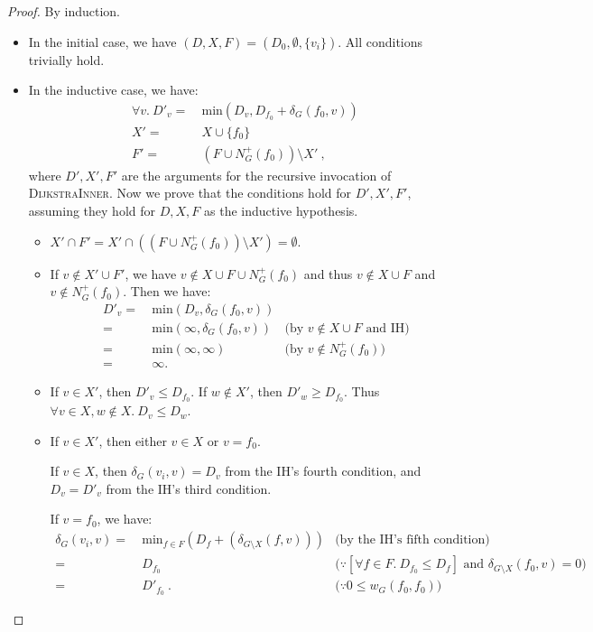 \documentclass[11pt,a4paper,oneside,microtype,nokorean]{oblivoir}
\begin{document}
\begin{proof}
  By induction.

  \begin{itemize}
  \item In the initial case, we have $(D, X, F) = (D_0, \emptyset, \{v_i\})$.  All conditions trivially hold.
  \item In the inductive case, we have:
    \begin{align*}
      \forall v.~D'_v =&~ \textrm{min}(D_v, D_{f_0} + \delta_G(f_0,v)) \\
      X' =&~ X \cup \{f_0\} \\
      F' =&~ (F \cup N^+_G(f_0)) \setminus X'~,
    \end{align*}
    where $D', X', F'$ are the arguments for the recursive invocation of \textsc{DijkstraInner}.
    Now we prove that the conditions hold for $D', X', F'$, assuming they hold for $D, X, F$ as the
    inductive hypothesis.

    \begin{itemize}
    \item $X' \cap F' = X' \cap ((F \cup N^+_G(f_0)) \setminus X') = \emptyset$.

    \item If $v \notin X' \cup F'$, we have $v \notin X \cup F \cup N^+_G(f_0)$ and thus
      $v \notin X \cup F$ and $v \notin N^+_G(f_0)$.  Then we have:
      \begin{align*}
        D'_v
        =&~ \textrm{min}(D_v, \delta_G(f_0,v)) \\
        =&~ \textrm{min}(\infty, \delta_G(f_0,v)) & \mbox{(by $v \notin X \cup F$ and IH)} \\
        =&~ \textrm{min}(\infty, \infty) & \mbox{(by $v \notin N^+_G(f_0)$)} \\
        =&~ \infty.
      \end{align*}

    \item If $v \in X'$, then $D'_v \le D_{f_0}$.  If $w \notin X'$, then $D'_w \ge D_{f_0}$.  Thus
      $\forall v\in X, w \notin X.~D_v \le D_w$.

    \item If $v \in X'$, then either $v \in X$ or $v = f_0$.

      If $v \in X$, then $\delta_G(v_i,v) = D_v$ from the IH's fourth condition, and $D_v = D'_v$
      from the IH's third condition.

      If $v = f_0$, we have:
      \begin{align*}
        \delta_G(v_i,v) =&~ \textrm{min}_{f \in F} (D_f + (\delta_{G \setminus X}(f,v))) & \mbox{(by the IH's
                                                                                           fifth condition)} \\
        =&~ D_{f_0} & \mbox{($\because [\forall f \in F.~D_{f_0} \le D_f]$ and
                      $\delta_{G \setminus X}(f_0,v) = 0$)} \\
        =&~ D'_{f_0}~. & \mbox{($\because 0 \le w_G(f_0,f_0)$)}
      \end{align*}


\end{itemize}
\end{itemize}
\end{proof}
\end{document}
